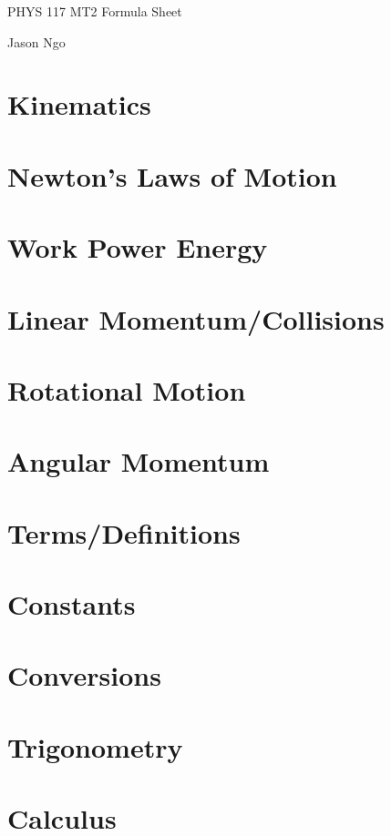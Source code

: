 \documentclass[letterpaper]{article}
\begin{document}
PHYS 117 MT2 Formula Sheet

Jason Ngo

\section{Kinematics}
\section{Newton's Laws of Motion}
\section{Work Power Energy}
\section{Linear Momentum/Collisions}
\section{Rotational Motion}
\section{Angular Momentum}

\appendix
\section{Terms/Definitions}
\section{Constants}
\section{Conversions}
\section{Trigonometry}
\section{Calculus}
\end{document}
